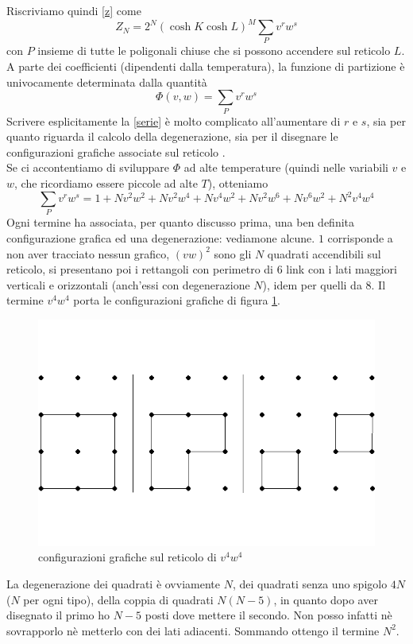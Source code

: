 \documentclass[11pt]{article}
\begin{document}
Riscriviamo quindi \ref{z} come
\begin{equation}\label{z3}
Z_N=2^N(\cosh{K}\cosh{L})^M\sum_Pv^rw^s
\end{equation}
con $P$ insieme di tutte le poligonali chiuse che si possono accendere sul reticolo $L$.\\
A parte dei coefficienti (dipendenti dalla temperatura), la funzione di partizione è univocamente determinata dalla quantità
\begin{equation}\label{serie}
\Phi(v,w)=\sum_Pv^rw^s
\end{equation}
Scrivere esplicitamente la \ref{serie} è molto complicato all'aumentare di $r$ e $s$, sia per quanto riguarda il calcolo della degenerazione, sia per il disegnare le configurazioni grafiche associate sul reticolo .\\ 
Se ci accontentiamo di sviluppare $\Phi$ ad alte temperature (quindi nelle variabili $v$ e $w$, che ricordiamo essere piccole ad alte $T$), otteniamo
\begin{equation}
\sum_Pv^rw^s=1+Nv^2w^2+Nv^2w^4+Nv^4w^2+Nv^2w^6+Nv^6w^2+N^2v^4w^4
\label{primiserie}
\end{equation}
Ogni termine ha associata, per quanto discusso prima, una ben definita configurazione grafica ed una degenerazione: vediamone alcune. $1$ corrisponde a non aver tracciato nessun grafico, $(vw)^2$ sono gli $N$ quadrati accendibili sul reticolo, si presentano poi i rettangoli con perimetro di $6$ link con i lati maggiori verticali e orizzontali (anch'essi con degenerazione $N$), idem per quelli da $8$. Il termine $v^4w^4$ porta le configurazioni grafiche di figura \ref{v4w4}. 
\begin{figure}
\centering
\includegraphics[width=0.9\columnwidth]{sat3}
\caption{configurazioni grafiche sul reticolo di $v^4w^4$ }
\label{v4w4}
\end{figure}
La degenerazione dei quadrati è ovviamente $N$, dei quadrati senza uno spigolo $4N$ ($N$ per ogni tipo), della coppia di quadrati $N(N-5)$, in quanto dopo aver disegnato il primo ho $N-5$ posti dove mettere il secondo. Non posso infatti nè sovrapporlo nè metterlo con dei lati adiacenti. Sommando ottengo il termine $N^2$.
\end{document}

